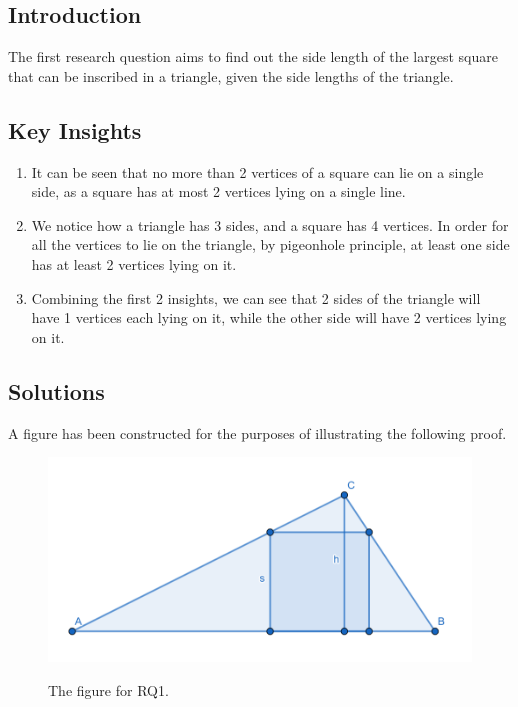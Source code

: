 \documentclass[12pt]{scrartcl}
\begin{document}
\subsection{Introduction}
The first research question aims to find out the side length of the largest square that can be inscribed in a triangle, given the side lengths of the triangle.

\subsection{Key Insights}
\begin{enumerate}
	\item It can be seen that no more than 2 vertices of a square can lie on a single side, as a square has at most 2 vertices lying on a single line.
	\item We notice how a triangle has 3 sides, and a square has 4 vertices. In order for all the vertices to lie on the triangle, by pigeonhole principle, at least one side has at least 2 vertices lying on it.
	\item Combining the first 2 insights, we can see that 2 sides of the triangle will have 1 vertices each lying on it, while the other side will have 2 vertices lying on it.
\end{enumerate}

\subsection{Solutions}
A figure has been constructed for the purposes of illustrating the following proof.
\begin{figure}[htpb]
\centering
\includegraphics[scale=.75]{images/rq1.png}
\label{fig:rq1_img}
\caption{The figure for RQ1.}
\end{figure}
\end{document}
